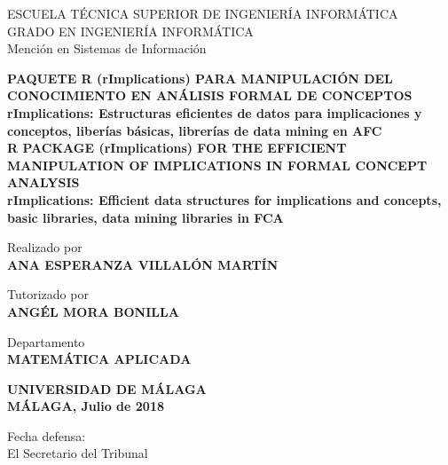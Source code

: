 \newpage
\thispagestyle{empty}
\mbox{}
\newpage
\thispagestyle{empty}
\mbox{}

\begin{titlepage}

    \begin{center}
		\normalsize {
            ESCUELA T\'ECNICA SUPERIOR DE INGENIER\'IA INFORM\'ATICA \\
            GRADO EN INGENIER\'IA INFORM\'ATICA \\
            Menci\'on en Sistemas de Informaci\'on \\}
	\end{center}

    \bigskip

    \begin{center}
		\normalsize {\textbf{
            PAQUETE R (rImplications) PARA MANIPULACI\'ON DEL CONOCIMIENTO 
            EN AN\'ALISIS FORMAL DE CONCEPTOS\\
            rImplications: Estructuras eficientes de datos para 
            implicaciones y conceptos, liber\'ias b\'asicas, 
            librer\'ias de data mining en AFC\\
            R PACKAGE (rImplications) FOR THE EFFICIENT MANIPULATION OF 
            IMPLICATIONS IN FORMAL CONCEPT ANALYSIS\\ 
            rImplications: Efficient data structures for implications 
            and concepts, basic libraries, data mining libraries in FCA
            }}
    \end{center}
    
    \smallskip

    \begin{center}
		\normalsize {
            Realizado por \\ \textbf{ANA ESPERANZA VILLAL\'ON MART\'IN}}
    \end{center}

    \begin{center}
		\normalsize {
            Tutorizado por \\ \textbf{ANG\'EL MORA BONILLA}}
    \end{center}

    \begin{center}
		\normalsize {
            Departamento \\ \textbf{MATEM\'ATICA APLICADA}}
    \end{center}

    \begin{center}
		\normalsize {
            \textbf{UNIVERSIDAD DE M\'ALAGA \\ M\'ALAGA, Julio de 2018}}
    \end{center}

    \bigskip

    \bigskip

    \begin{flushleft}
		\normalsize {
            Fecha defensa: \\ El Secretario del Tribunal}
    \end{flushleft}

\end{titlepage}

\newpage
\thispagestyle{empty}
\mbox{}

\newpage